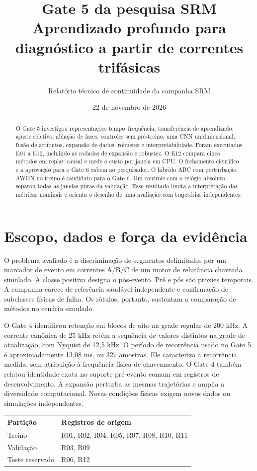 \documentclass[11pt,a4paper]{article}
\title{Gate 5 da pesquisa SRM\\Aprendizado profundo para diagnóstico a partir de correntes trifásicas}
\author{Relatório técnico de continuidade da campanha SRM}
\date{22 de novembro de 2026}
\begin{document}
\maketitle
\begin{abstract}
O Gate 5 investigou representações tempo--frequência, transferência de aprendizado, ajuste seletivo, ablação de fases, controles sem pré-treino, uma CNN unidimensional, fusão de atributos, expansão de dados, robustez e interpretabilidade. Foram executados E01 a E12, incluindo as rodadas de expansão e robustez. O E12 compara cinco métodos em replay causal e mede o custo por janela em CPU. O fechamento científico e a aprovação para o Gate 6 cabem ao pesquisador. O híbrido ABC com perturbação AWGN no treino é candidato para o Gate 6. Um controle com o relógio absoluto separou todas as janelas puras da validação. Esse resultado limita a interpretação das métricas nominais e orienta o desenho de uma avaliação com trajetórias independentes.
\end{abstract}
\tableofcontents
\clearpage

\section{Escopo, dados e força da evidência}
O problema avaliado é a discriminação de segmentos delimitados por um marcador de evento em correntes A/B/C de um motor de relutância chaveada simulado. A classe positiva designa o pós-evento. Pré e pós são proxies temporais. A campanha carece de referência saudável independente e confirmação de subclasses físicas de falha. Os rótulos, portanto, sustentam a comparação de métodos no cenário simulado.

O Gate 4 identificou retenção em blocos de oito na grade regular de 200 kHz. A corrente canônica de 25 kHz retém a sequência de valores distintos na grade de atualização, com Nyquist de 12,5 kHz. O período de recorrência usado no Gate 5 é aproximadamente 13,08 ms, ou 327 amostras. Ele caracteriza a recorrência medida, sem atribuição à frequência física de chaveamento. O Gate 4 também relatou identidade exata no suporte pré-evento comum em registros de desenvolvimento. A expansão perturba as mesmas trajetórias e amplia a diversidade computacional. Novas condições físicas exigem novos dados ou simulações independentes.

\begin{center}
\begin{tabular}{@{}lp{.76\linewidth}@{}}\toprule
Partição & Registros de origem\\\midrule
Treino & R01, R02, R04, R05, R07, R08, R10, R11\\
Validação & R03, R09\\
Teste reservado & R06, R12\\\bottomrule
\end{tabular}
\end{center}
\end{document}
